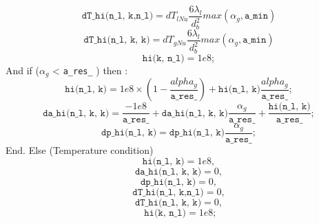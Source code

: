 \begin{equation}
\texttt{dT\_hi(n_l, k,n_l)}= dT_{lNu} \frac{6\lambda_l}{d_b^2}max(\alpha_g,\texttt{a\_min})
\end{equation}
\begin{equation}
\texttt{dT\_hi(n_l, k, k)} = dT_{gNu} \frac{6\lambda_l}{d_b^2}max(\alpha_g,\texttt{a\_min})
\end{equation}
\begin{equation}
            \texttt{hi(k, n_l)} = 1e8;
\end{equation}
And if ($\alpha_g$ < \texttt{a\_res\_} ) then :
\begin{equation}
\texttt{hi(n_l, k)}  = 1e8 \times(1-\frac{alpha_g}{\texttt{a\_res\_} }) + \texttt{hi(n_l, k)} \frac{alpha_g}{\texttt{a\_res\_} };
\end{equation}
\begin{equation}
\texttt{da\_hi(n_l, k, k)} =  \frac{-1e8}{\texttt{a\_res\_} } + \texttt{da\_hi(n_l, k, k)}\frac{\alpha_g}{\texttt{a\_res\_} } + \frac{\texttt{hi(n_l, k)}}{\texttt{a\_res\_} };
\end{equation}
\begin{equation}
\texttt{dp\_hi(n_l, k)}    = \texttt{dp\_hi(n_l, k)}\frac{\alpha_g}{\texttt{a\_res\_} } ;
\end{equation}
End. Else (Temperature condition)
\begin{equation}
    \texttt{hi(n_l, k)} = 1e8,
\end{equation}
\begin{equation}
\texttt{da\_hi(n_l, k, k)} = 0,
\end{equation}
\begin{equation}
 \texttt{dp\_hi(n_l, k)}    = 0,
\end{equation}
\begin{equation}
\texttt{dT\_hi(n_l, k,n_l)}= 0,
\end{equation}
\begin{equation}
\texttt{dT\_hi(n_l, k, k)} = 0,
\end{equation}
\begin{equation}
           \texttt{ hi(k, n_l)} = 1e8;
\end{equation}

